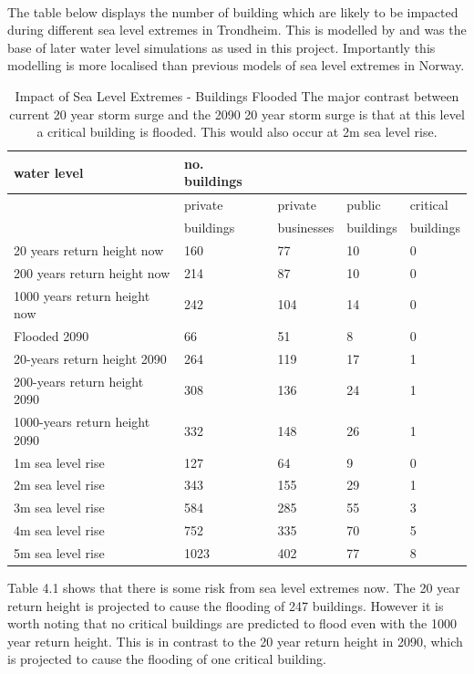 \paragraph{}
The table below displays the number of building which are likely to be impacted during different sea level extremes in Trondheim. This is modelled by \cite{kartverket_se_2021} and was the base of later water level simulations as used in this project. Importantly this modelling is more localised than previous models of sea level extremes in Norway.

\begin{table}[h]
    \centering
    \begin{tabular}{|l|l|l|l|l|}
    \hline
        water level & no. buildings  & ~ & ~ & ~ \\ \hline
        ~ & private & private & public  & critical  \\ \newline
        ~ & buildings & businesses & buildings & buildings \\ \hline        
        20 years return height now & 160 & 77 & 10 & 0 \\ \hline
        200 years return height now & 214 & 87 & 10 & 0 \\ \hline
        1000 years return height now & 242 & 104 & 14 & 0 \\ \hline
        Flooded 2090 & 66 & 51 & 8 & 0 \\ \hline
        20-years return height 2090 & 264 & 119 & 17 & 1 \\ \hline
        200-years return height  2090 & 308 & 136 & 24 & 1 \\ \hline
        1000-years return height  2090 & 332 & 148 & 26 & 1 \\ \hline
        1m sea level rise & 127 & 64 & 9 & 0 \\ \hline
        2m sea level rise & 343 & 155 & 29 & 1 \\ \hline
        3m sea level rise & 584 & 285 & 55 & 3 \\ \hline
        4m sea level rise & 752 & 335 & 70 & 5 \\ \hline
        5m sea level rise & 1023 & 402 & 77 & 8 \\ \hline
    \end{tabular}
    \caption{Impact of Sea Level Extremes - Buildings Flooded \cite{kartverket_se_2021} The major contrast between current 20 year storm surge and the 2090 20 year storm surge is that at this level a critical building is flooded. This would also occur at 2m sea level rise.}
    \label{building-impact-sle}
\end{table}
Table 4.1 shows that there is some risk from sea level extremes now. The 20 year return height is projected to cause the flooding of 247 buildings. However it is worth noting that no critical buildings are predicted to flood even with the 1000 year return height. This is in contrast to the 20 year return height in 2090, which is projected to cause the flooding of one critical building.


